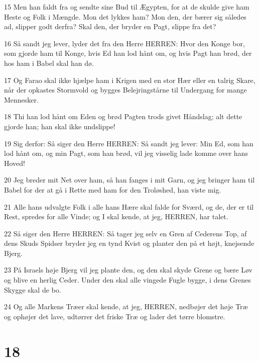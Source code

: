 \par 15 Men han faldt fra og sendte sine Bud til Ægypten, for at de skulde give ham Heste og Folk i Mængde. Mon det lykkes ham? Mon den, der bærer sig således ad, slipper godt derfra? Skal den, der bryder en Pagt, slippe fra det?
\par 16 Så sandt jeg lever, lyder det fra den Herre HERREN: Hvor den Konge bor, som gjorde ham til Konge, hvis Ed han lod hånt om, og hvis Pagt han brød, der hos ham i Babel skal han dø.
\par 17 Og Farao skal ikke hjælpe ham i Krigen med en stor Hær eller en talrig Skare, når der opkastes Stormvold og bygges Belejringstårne til Undergang for mange Mennesker.
\par 18 Thi han lod hånt om Eden og brød Pagten trods givet Håndslag; alt dette gjorde han; han skal ikke undslippe!
\par 19 Sig derfor: Så siger den Herre HERREN: Så sandt jeg lever: Min Ed, som han lod hånt om, og min Pagt, som han brød, vil jeg visselig lade komme over hans Hoved!
\par 20 Jeg breder mit Net over ham, så han fanges i mit Garn, og jeg bringer ham til Babel for der at gå i Rette med ham for den Troløshed, han viste mig.
\par 21 Alle hans udvalgte Folk i alle hans Hære skal falde for Sværd, og de, der er til Rest, spredes for alle Vinde; og I skal kende, at jeg, HERREN, har talet.
\par 22 Så siger den Herre HERREN: Så tager jeg selv en Gren af Cederens Top, af dens Skuds Spidser bryder jeg en tynd Kvist og planter den på et højt, knejsende Bjerg.
\par 23 På Israels høje Bjerg vil jeg plante den, og den skal skyde Grene og bære Løv og blive en herlig Ceder. Under den skal alle vingede Fugle bygge, i dens Grenes Skygge skal de bo.
\par 24 Og alle Markens Træer skal kende, at jeg, HERREN, nedbøjer det høje Træ og ophøjer det lave, udtørrer det friske Træ og lader det tørre blomstre.

\chapter{18}

